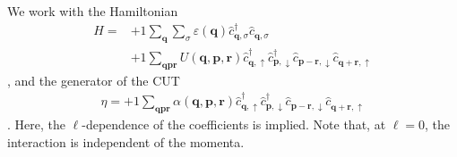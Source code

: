 We work with the Hamiltonian 
\begin{align}
H =	&+1 \sum_{ \mathbf{q} } \sum_{ \sigma } \varepsilon( \mathbf{q} )   \hat{c}_{ \mathbf{q}, \sigma }^\dagger  \hat{c}_{ \mathbf{q}, \sigma }^{\phantom{\dagger}}  \\
	&+1 \sum_{ \mathbf{q} \mathbf{p} \mathbf{r} } U( \mathbf{q}, \mathbf{p}, \mathbf{r} )   \hat{c}_{ \mathbf{q}, \uparrow }^\dagger  \hat{c}_{ \mathbf{p}, \downarrow }^\dagger  \hat{c}_{ \mathbf{p}-\mathbf{r}, \downarrow }^{\phantom{\dagger}} \hat{c}_{ \mathbf{q}+\mathbf{r}, \uparrow }^{\phantom{\dagger}} 
\end{align}
, and the generator of the CUT
\begin{align}
\eta =+1 \sum_{ \mathbf{q} \mathbf{p} \mathbf{r} } \alpha( \mathbf{q}, \mathbf{p}, \mathbf{r} )   \hat{c}_{ \mathbf{q}, \uparrow }^\dagger  \hat{c}_{ \mathbf{p}, \downarrow }^\dagger  \hat{c}_{ \mathbf{p}-\mathbf{r}, \downarrow }^{\phantom{\dagger}} \hat{c}_{ \mathbf{q}+\mathbf{r}, \uparrow }^{\phantom{\dagger}} \end{align}
. Here, the $\ell$-dependence of the coefficients is implied. Note that, at $\ell=0$, the interaction is independent of the momenta. 

